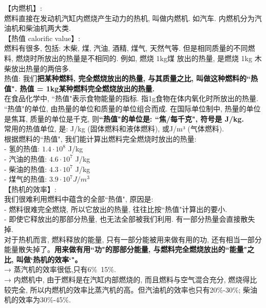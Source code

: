\documentclass[UTF8]{ctexart}
\begin{document}
	
	【内燃机】: \\
	燃料直接在发动机汽缸内燃烧产生动力的热机, 叫做内燃机. 如汽车. 内燃机分为汽油机和柴油机两大类. \\
	
	
	【热值 calorific value】: \\
	燃料有很多, 包括: 木柴, 煤, 汽油, 酒精, 煤气, 天然气等. 但是相同质量的不同燃料, 燃烧时所放出的热量是不相同的. 例如, 燃烧 1kg煤 放出的热量, 是燃烧 1kg 木柴放出热量的两倍多. \\
	
	热值: 我们\textbf{把某种燃料, 完全燃烧放出的热量, 与其质量之比, 叫做这种燃料的``热值". 热值 = 1kg某种燃料完全燃烧放出的热量.} \\
	在食品化学中, ``热值"表示食物能量的指标. 指1g食物在体内氧化时所放出的热量. \\
	
	``热值"的单位,  由热量的单位和质量的单位组合而成. 在国际单位制中, 热量的单位是焦耳, 质量的单位是千克, 则\textbf{``热值"的单位是: ``焦/每千克", 符号是 J/kg.} \\
	常用的热值单位, 是: J/kg (固体燃料和液体燃料), 或J/m³ (气体燃料). \\
	
	
	根据燃料的``热值", 我们能计算出燃料完全燃烧时放出的热量: \\
	- 氢的热值: $1.4 \cdot 10^8$ J/kg \\
	- 汽油的热值: $4.6 \cdot 10^7$ J/kg \\
	- 柴油的热值: $4.3 \cdot 10^7$ J/kg \\
	- 煤气的热值: $3.9 \cdot 10^7 J/m^3$ \\
	
	
	
	【热机的效率】: \\
	我们很难利用燃料中蕴含的全部``热值", 原因是: \\
	- 燃料很难完全燃烧, 所以它放出的热量, 往往比按``热值"计算出的要小.  \\
	- 即使它释放出的那部分热量, 也无法全部被我们利用. 有一部分热量会直接散失掉. \\
	
	对于热机而言, 燃料释放的能量, 只有一部分能被用来做有用的功, 还有相当一部分能量散失掉了。\textbf{用来做有用``功"的那部分能量, 与燃料完全燃烧放出的``能量"之比, 叫做`热机的效率`"。} \\
	→ 蒸汽机的效率很低,只有6\%~15\%. 	\\
	→ 内燃机中, 由于燃料是在汽缸内部燃烧的, 而且燃料与空气混合充分, 燃烧得比较完全, 所以内燃机的效率比蒸汽机的高。但汽油机的效率也只有20\%-30\%; 柴油机的效率为30\%-45\%. \\
	
\end{document}

